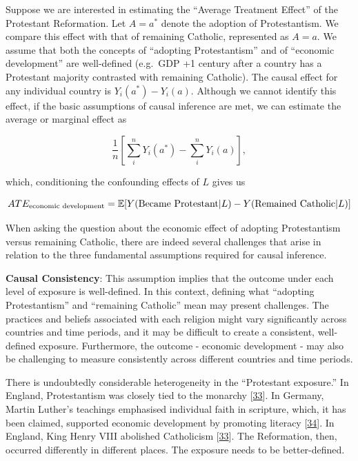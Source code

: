 \documentclass[
  singlecolumn]{article}
\begin{document}
Suppose we are interested in estimating the ``Average Treatment Effect''
of the Protestant Reformation. Let \(A = a^*\) denote the adoption of
Protestantism. We compare this effect with that of remaining Catholic,
represented as \(A = a\). We assume that both the concepts of ``adopting
Protestantism'' and of ``economic development'' are well-defined
(e.g.~GDP +1 century after a country has a Protestant majority
contrasted with remaining Catholic). The causal effect for any
individual country is \(Y_i(a^*) - Y_i(a)\). Although we cannot identify
this effect, if the basic assumptions of causal inference are met, we
can estimate the average or marginal effect as

\[\frac{1}{n} \left[\sum_i^{n} Y_i(a^*) - \sum_i^{n} Y_i(a)\right],\]

which, conditioning the confounding effects of \(L\) gives us

\[ATE_{\textnormal{economic~development}} = \mathbb{E}[Y(\textnormal{Became~Protestant}|L) - Y(\textnormal{Remained~Catholic}|L)]\]

When asking the question about the economic effect of adopting
Protestantism versus remaining Catholic, there are indeed several
challenges that arise in relation to the three fundamental assumptions
required for causal inference.

\textbf{Causal Consistency}: This assumption implies that the outcome
under each level of exposure is well-defined. In this context, defining
what ``adopting Protestantism'' and ``remaining Catholic'' mean may
present challenges. The practices and beliefs associated with each
religion might vary significantly across countries and time periods, and
it may be difficult to create a consistent, well-defined exposure.
Furthermore, the outcome - economic development - may also be
challenging to measure consistently across different countries and time
periods.

There is undoubtedly considerable heterogeneity in the ``Protestant
exposure.'' In England, Protestantism was closely tied to the monarchy
{[}\protect\hyperlink{ref-collinson2007}{33}{]}. In Germany, Martin
Luther's teachings emphasised individual faith in scripture, which, it
has been claimed, supported economic development by promoting literacy
{[}\protect\hyperlink{ref-gawthrop1984}{34}{]}. In England, King Henry
VIII abolished Catholicism
{[}\protect\hyperlink{ref-collinson2007}{33}{]}. The Reformation, then,
occurred differently in different places. The exposure needs to be
better-defined.
\end{document}
